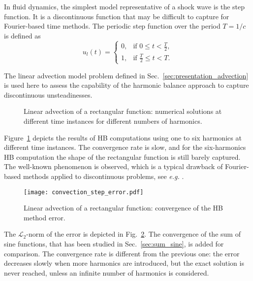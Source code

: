 
In fluid dynamics, the simplest model 
representative of a shock wave
is the step function. It is a discontinuous function
that may be difficult to capture for Fourier-based time methods.
The periodic step function over the period $T=1/c$ is defined as
\begin{equation}
    u_l(t) = 
    \begin{cases}
        0, & \text{if } 0 \leq t < \frac{T}{2}, \\
        1, & \text{if } \frac{T}{2} \leq t < T.
    \end{cases}
    \label{eq:inject_step}
\end{equation}

The linear advection model problem defined in 
Sec.~\ref{sec:presentation_advection} is used here to assess
the capability of the harmonic balance approach to capture
discontinuous unsteadinesses.

\begin{figure}[htp]
  \centering
  \caption{Linear advection of a rectangular function: 
  numerical solutions at different time instances for different numbers of harmonics.}
  \label{fig:inj_step_results}
\end{figure}
Figure~\ref{fig:inj_step_results} depicts the results of HB computations
using one to six harmonics at different time instances. The convergence rate 
is slow, and for the six-harmonics HB computation the
shape of the rectangular function is still barely captured. 
The well-known \citet{Gibbs1899}
phenomenon is observed, which is a typical drawback 
of Fourier-based methods applied to discontinuous problems, 
see \emph{e.g.} \citet{Canuto2006}.

\begin{figure}[htp]
  \centering
  \texttt{[image: convection\_step\_error.pdf]}
  \caption{Linear advection of a rectangular function: convergence of the HB method error.}
  \label{fig:conv_step}
\end{figure}
The $\mathcal{L}_2$-norm 
of the error is depicted in Fig.~\ref{fig:conv_step}. 
The convergence of the sum of sine functions, 
that has been studied in Sec.~\ref{sec:sum_sine},
is added for comparison.
The convergence rate is different from the previous one: 
the error decreases slowly when more harmonics are introduced, 
but the exact solution is never reached, 
unless an infinite number of harmonics is considered.

